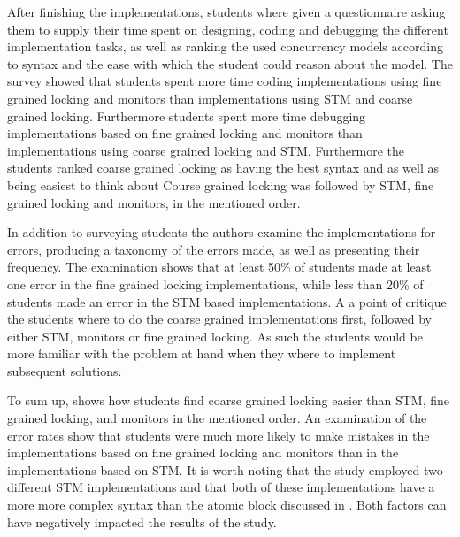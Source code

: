 After finishing the implementations, students where given a questionnaire asking them to supply their time spent on designing, coding and debugging the different implementation tasks, as well as ranking the used concurrency models according to syntax and the ease with which the student could reason about the model. The survey showed that students spent more time coding implementations using fine grained locking and monitors than implementations using \ac{STM} and coarse grained locking\cite[p. 51]{rossbach2010transactional}. Furthermore students spent more time debugging implementations based on fine grained locking and monitors than implementations using coarse grained locking and \ac{STM}\cite[p. 51]{rossbach2010transactional}. Furthermore the students ranked coarse grained locking as having the best syntax and as well as being easiest to think about Course grained locking was followed by \ac{STM}, fine grained locking and monitors, in the mentioned order.

In addition to surveying students the authors examine the implementations for errors, producing a taxonomy of the errors made, as well as presenting their frequency. The examination shows that at least 50\% of students made at least one error in the fine grained locking implementations, while less than 20\% of students made an error in the \ac{STM} based implementations. A a point of critique the students where to do the coarse grained implementations first, followed by either \ac{STM}, monitors or fine grained locking. As such the students would be more familiar with the problem at hand when they where to implement subsequent solutions.

To sum up, \cite{rossbach2010transactional} shows how students find coarse grained locking easier than \ac{STM}, fine grained locking, and monitors in the mentioned order\cite[p. 54]{rossbach2010transactional}. An examination of the error rates show that students were much more likely to make mistakes in the implementations based on fine grained locking and monitors than in the implementations based on \ac{STM}\cite[p. 54]{rossbach2010transactional}. It is worth noting that the study employed two different \ac{STM} implementations and that both of these implementations have a more more complex syntax than the atomic block discussed in \cite[p. 49]{rossbach2010transactional}. Both factors can have negatively impacted the results of the study.

